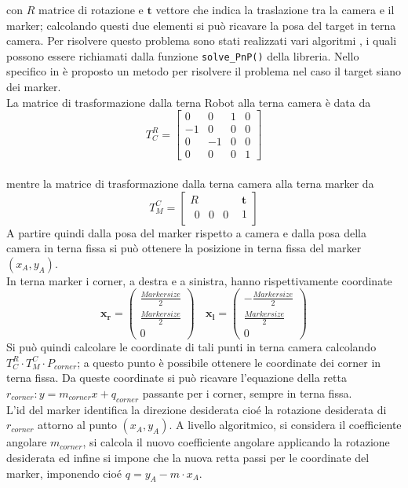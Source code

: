   con $R$ matrice di rotazione e $ \boldsymbol{t}$ vettore che indica la traslazione tra la camera e il marker; calcolando questi due elementi si può ricavare la 
  posa del target in terna camera. Per risolvere questo problema sono stati realizzati vari algoritmi \cite{marchand2015pose}, i quali possono essere richiamati dalla 
  funzione \texttt{solve\_PnP()} della libreria. Nello specifico in \cite{infinitesimal} è proposto un metodo per risolvere il problema nel caso il target siano dei
  marker. \\
  La matrice di trasformazione dalla terna Robot alla terna camera è data da\\   
\begin{equation}
T^R_C = \begin{bmatrix} 0 & 0 & 1 & 0 \\ -1 & 0 & 0 & 0 \\ 0 & -1 & 0 & 0 \\ 0 & 0 & 0 & 1 \end{bmatrix} 
\end{equation}\\ mentre la matrice di trasformazione dalla terna camera alla terna marker da 
\begin{equation}
T^C_M = \begin{bmatrix} R & \boldsymbol{t} \\ \begin{matrix} 0 & 0  & 0 \end{matrix} & 1 \end{bmatrix}
\end{equation}
  A partire quindi dalla posa del marker rispetto a camera e dalla posa della camera in terna fissa si può ottenere la posizione in terna fissa del marker $(x_A, y_A)$.\\
  In terna marker i corner, a destra e a sinistra, hanno rispettivamente coordinate
  \[
     {\boldsymbol{x_r}}=\begin{pmatrix} \frac{Markersize}{2} \\ \frac{Markersize}{2} \\ 0 \end{pmatrix} \ \ \ \;
     {\boldsymbol{x_l}}=\begin{pmatrix} -\frac{Markersize}{2} \\ \frac{Markersize}{2} \\ 0 \end{pmatrix}
  \]
  Si può quindi calcolare le coordinate di tali punti in terna camera calcolando $T^R_C \cdot T^C_M \cdot P_{corner}$; a questo punto è possibile ottenere le coordinate
  dei corner in terna fissa. Da queste coordinate si può ricavare l'equazione della retta $r_{corner}: y = m_{corner} x + q_{corner}$ passante per i corner, sempre in 
  terna fissa. \\
  L'id del marker identifica la direzione desiderata cioé la rotazione desiderata di $r_{corner}$ attorno al punto $(x_A, y_A)$. A livello algoritmico, si considera
  il coefficiente angolare $m_{corner}$, si calcola il nuovo coefficiente angolare applicando la rotazione desiderata ed infine si impone che la nuova retta 
  passi per le coordinate del marker, imponendo cioé $q = y_A - m \cdot x_A$.
  
